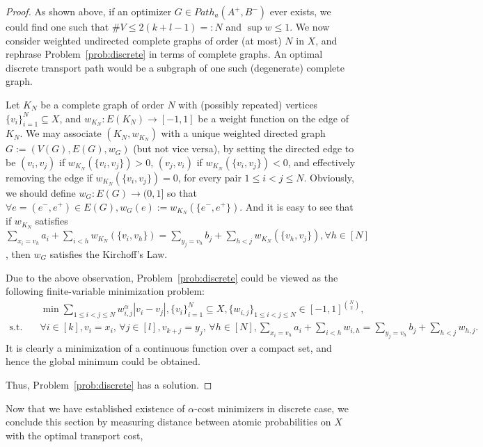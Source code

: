 \documentclass[fleqn]{article}
\theoremstyle{definition}
\theoremstyle{remark}
\begin{document}
\begin{proof}
As shown above, if an optimizer $G\in Path_a(A^+,B^-)$ ever exists, we could find one such that $\#V\le 2(k+l-1)=:N$ and $\sup w \le 1$. We now consider weighted undirected complete graphs of order (at most) $N$ in $X$, and rephrase Problem~\ref{prob:discrete} in terms of complete graphs. An optimal discrete transport path would be a subgraph of one such (degenerate) complete graph.
\par
Let $K_N$ be a complete graph of order $N$ with (possibly repeated) vertices $\{v_i\}_{i=1}^N \subseteq X$, and $w_{K_N}:E(K_N)\rightarrow[-1,1]$ be a weight function on the edge of $K_N$. We may associate $(K_N,w_{K_N})$ with a unique weighted directed graph $G:=\left(V(G),E(G),w_G\right)$ (but not vice versa), by setting the directed edge to be $(v_i,v_j)$ if $w_{K_N}\left(\{v_i,v_j\}\right)>0$, $(v_j,v_i)$ if $w_{K_N}\left(\{v_i,v_j\}\right)<0$, and effectively removing the edge if $w_{K_N}\left(\{v_i,v_j\}\right)=0$, for every pair $1\le i<j\le N$. Obviously, we should define $w_G:E(G)\rightarrow (0,1]$ so that ${\forall e=(e^-,e^+)\in E(G)}, {w_G(e):=w_{K_N}(\{e^-,e^+\})}$. And it is easy to see that if $w_{K_N}$ satisfies ${\sum_{x_i=v_h} a_i + \sum_{i<h} w_{K_N}(\{v_i,v_h\})} = {\sum_{y_j=v_h} b_j + \sum_{h<j} w_{K_N}(\{v_h,v_j\})}, \forall h\in [N]$, then $w_G$ satisfies the Kirchoff's Law.
\par 
Due to the above observation, Problem~\ref{prob:discrete} could be viewed as the following finite-variable minimization problem:
\begin{align*}
& \min \sum_{1\le i<j\le N} w_{i,j}^\alpha |v_i-v_j|, \{v_i\}_{i=1}^N \subseteq X, \{w_{i,j}\}_{1\le i<j\le N} \in [-1,1]^{\binom{N}{2}}, \\
\textrm{s.t.}\quad & \forall i\in[k], v_i=x_i, \,\forall j\in[l], v_{k+j}=y_j, \,\forall h\in[N], {\sum_{x_i=v_h} a_i + \sum_{i<h} w_{i,h}} = {\sum_{y_j=v_h} b_j + \sum_{h<j} w_{h,j}}.
\end{align*}
It is clearly a minimization of a continuous function over a compact set, and hence the global minimum could be obtained.
\par 
Thus, Problem~\ref{prob:discrete} has a solution.
\end{proof}

Now that we have established existence of $\alpha$-cost minimizers in discrete case, we conclude this section by measuring distance between atomic probabilities on $X$ with the optimal transport cost, 
\end{document}
